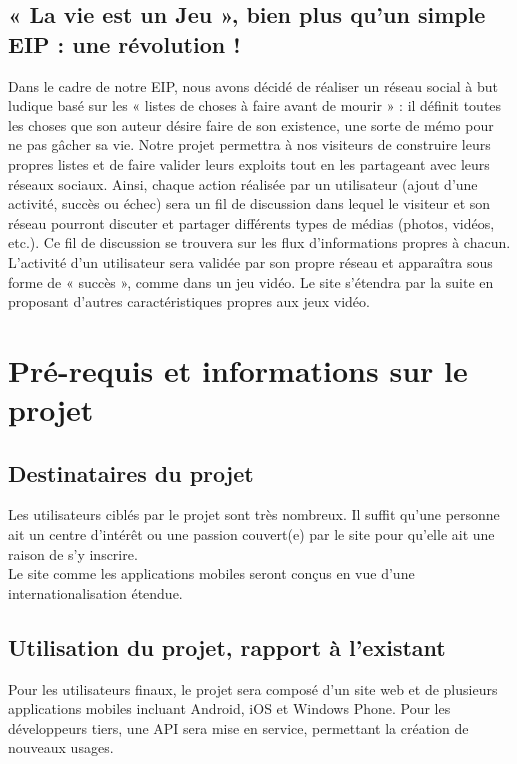 \documentclass{life-fr}
\begin{document}
\section{« La vie est un Jeu », bien plus qu'un simple EIP : une révolution !}

Dans le cadre de notre EIP, nous avons décidé de réaliser un réseau social à but ludique basé sur les « listes de choses à faire avant de mourir » : il définit toutes les choses que son auteur désire faire de son existence, une sorte de mémo pour ne pas gâcher sa vie. Notre projet permettra à nos visiteurs de construire leurs propres listes et de faire valider leurs exploits tout en les partageant avec leurs réseaux sociaux. Ainsi, chaque action réalisée par un utilisateur (ajout d'une activité, succès ou échec) sera un fil de discussion dans lequel le visiteur et son réseau pourront discuter et partager différents types de médias (photos, vidéos, etc.). Ce fil de discussion se trouvera sur les flux d'informations propres à chacun. L'activité d'un utilisateur sera validée par son propre réseau et apparaîtra sous forme de « succès », comme dans un jeu vidéo. Le site s'étendra par la suite en proposant d'autres caractéristiques propres aux jeux vidéo.


\chapter{Pré-requis et informations sur le projet}

\section{Destinataires du projet}

Les utilisateurs ciblés par le projet sont très nombreux. Il suffit qu'une personne ait un centre d'intérêt ou une passion couvert(e) par le site pour qu'elle ait une raison de s'y inscrire.\\

Le site comme les applications mobiles seront conçus en vue d'une internationalisation étendue.

\section{Utilisation du projet, rapport à l'existant}

Pour les utilisateurs finaux, le projet sera composé d'un site web et de plusieurs applications mobiles incluant Android, iOS et Windows Phone. Pour les développeurs tiers, une API sera mise en service, permettant la création de nouveaux usages.\\
\end{document}
